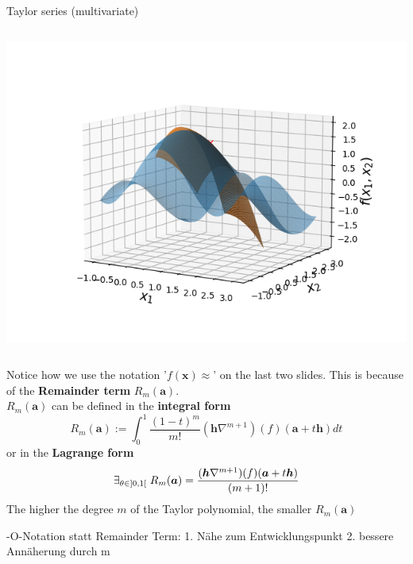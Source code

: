 \begin{vbframe}{Taylor series (multivariate)}
\begin{columns}
\begin{column}{0.48\textwidth}
      \includegraphics[width = \textwidth]{figure_man/Taylor2D/Taylor2D_2nd-301.png}
    \end{column}
  \end{columns}  

  \framebreak

  Notice how we use the notation '$f(\bm{x}) \approx$' on the last two slides. This is because of the \textbf{Remainder term} $R_{m}(\bm{a})$.\\
  $R_{m}(\bm{a})$ can be defined in the \textbf{integral form}
  $$R_{m}(\bm{a}) := \int_{0}^{1}\frac{(1-t)^{m}}{m!}(\bm{h}\nabla^{m+1})(f)(\bm{a}+t\bm{h}) dt$$
  or in the \textbf{Lagrange form}
  $$\exists_{\theta \in ]0,1[} \hspace{0.1cm} R_{m}(\bm{a}) = \frac{(\bm{h}\nabla^{m+1})(f)(\bm{a}+t\bm{h})}{(m+1)!}$$
  The higher the degree $m$ of the Taylor polynomial, the smaller $R_{m}(\bm{a})$

   \framebreak
   -O-Notation statt Remainder Term:
   1. Nähe zum Entwicklungspunkt
   2. bessere Annäherung durch m


\end{vbframe}



  \endlecture
